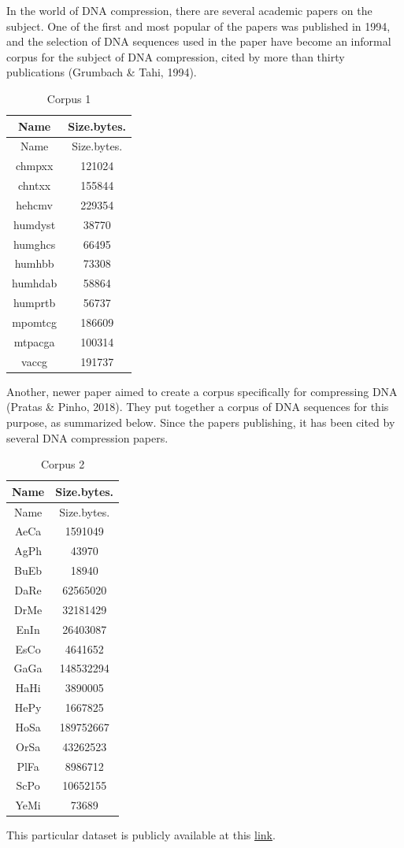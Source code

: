 \documentclass[12pt,twoside]{reedthesis}
\begin{document}
In the world of DNA compression, there are several academic papers on the subject. One of the first and most popular of the papers was published in 1994, and the selection of DNA sequences used in the paper have become an informal corpus for the subject of DNA compression, cited by more than thirty publications (Grumbach \& Tahi, 1994).
\begin{longtable}[]{@{}cc@{}}
\caption{\label{tab:corpus1filesfig}Corpus 1}\tabularnewline
\toprule()
Name & Size.bytes. \\
\midrule()
\endfirsthead
\toprule()
Name & Size.bytes. \\
\midrule()
\endhead
chmpxx & 121024 \\
chntxx & 155844 \\
hehcmv & 229354 \\
humdyst & 38770 \\
humghcs & 66495 \\
humhbb & 73308 \\
humhdab & 58864 \\
humprtb & 56737 \\
mpomtcg & 186609 \\
mtpacga & 100314 \\
vaccg & 191737 \\
\bottomrule()
\end{longtable}
Another, newer paper aimed to create a corpus specifically for compressing DNA (Pratas \& Pinho, 2018). They put together a corpus of DNA sequences for this purpose, as summarized below. Since the papers publishing, it has been cited by several DNA compression papers.
\begin{longtable}[]{@{}cc@{}}
\caption{\label{tab:corpus2filesfig}Corpus 2}\tabularnewline
\toprule()
Name & Size.bytes. \\
\midrule()
\endfirsthead
\toprule()
Name & Size.bytes. \\
\midrule()
\endhead
AeCa & 1591049 \\
AgPh & 43970 \\
BuEb & 18940 \\
DaRe & 62565020 \\
DrMe & 32181429 \\
EnIn & 26403087 \\
EsCo & 4641652 \\
GaGa & 148532294 \\
HaHi & 3890005 \\
HePy & 1667825 \\
HoSa & 189752667 \\
OrSa & 43262523 \\
PlFa & 8986712 \\
ScPo & 10652155 \\
YeMi & 73689 \\
\bottomrule()
\end{longtable}
This particular dataset is publicly available at this \href{https://tinyurl.com/DNAcorpus}{link}.
\end{document}
